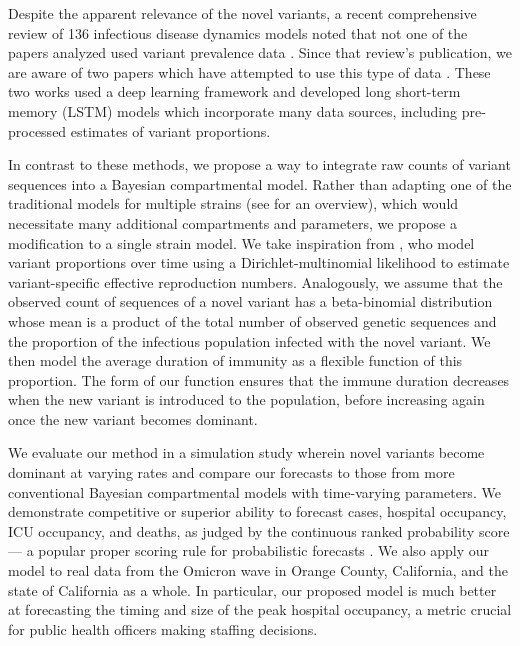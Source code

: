 Despite the apparent relevance of the novel variants, a recent comprehensive review of 136 infectious disease dynamics models noted that not one of the papers analyzed used variant prevalence data \citep{Nixon2022evaluation}.
Since that review's publication, we are aware of two papers which have attempted to use this type of data \citep{Du2023Incorporating, Rashed2022Covid}.
These two works used a deep learning framework and developed long short-term memory (LSTM) models which incorporate many data sources, including pre-processed estimates of variant proportions.

In contrast to these methods, we propose a way to integrate raw counts of variant sequences into a Bayesian compartmental model.
Rather than adapting one of the traditional models for multiple strains (see \citet{Kucharski2016Capturing} for an overview), which would necessitate many additional compartments and parameters, we propose a modification to a single strain model.
We take inspiration from \citet{Figgins2021variant}, who model variant proportions over time using a Dirichlet-multinomial likelihood to estimate variant-specific effective reproduction numbers.
Analogously, we assume that the observed count of sequences of a novel variant has a beta-binomial distribution whose mean is a product of the total number of observed genetic sequences and the proportion of the infectious population infected with the novel variant.
We then model the average duration of immunity as a flexible function of this proportion.
The form of our function ensures that the immune duration decreases when the new variant is introduced to the population, before increasing again once the new variant becomes dominant.

We evaluate our method in a simulation study wherein novel variants become dominant at varying rates and compare our forecasts to those from more conventional Bayesian compartmental models with time-varying parameters.
We demonstrate competitive or superior ability to forecast cases, hospital occupancy, ICU occupancy, and deaths, as judged by the continuous ranked probability score --- a popular proper scoring rule for probabilistic forecasts \citep{gneiting2007strictly}.
We also apply our model to real data from the Omicron wave in Orange County, California, and the state of California as a whole.
In particular, our proposed model is much better at forecasting the timing and size of the peak hospital occupancy, a metric crucial for public health officers making staffing decisions.


